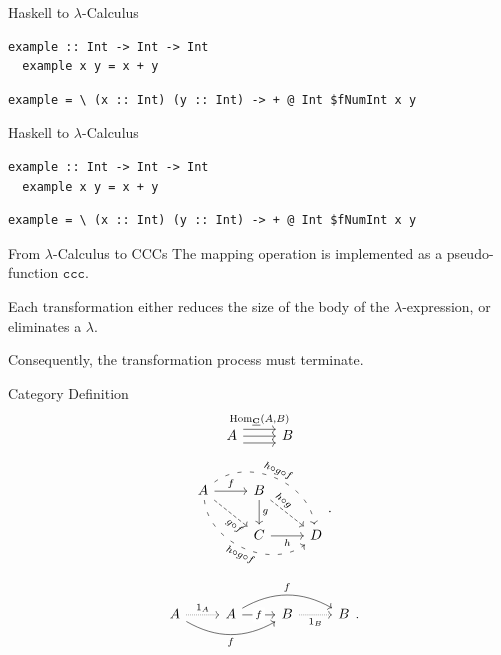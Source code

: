 \documentclass[10pt]{beamer}
\newcommand{\Cat}[1]{\ensuremath{\underline{\mathbf{#1}}}}
\newcommand{\Hom}[3]{\ensuremath{\mathrm{Hom}_{\Cat{#1}}(#2,#3)}}
\newcommand{\ccc}{\ensuremath{\mathtt{ccc}}}
\theoremstyle{definition}
\theoremstyle{remark}
\numberwithin{equation}{section}
\begin{document}
\begin{frame}[fragile]{Haskell to $\lambda$-Calculus}
  \begin{lstlisting}[frame=single]
  example :: Int -> Int -> Int
  example x y = x + y
  \end{lstlisting}

  \begin{lstlisting}[frame=single]
  example = \ (x :: Int) (y :: Int) -> + @ Int $fNumInt x y
  \end{lstlisting}
\end{frame}

\begin{frame}[fragile]{Haskell to $\lambda$-Calculus}
  \begin{lstlisting}[frame=single]
  example :: Int -> Int -> Int
  example x y = x + y
  \end{lstlisting}

  \begin{lstlisting}[frame=single]
  example = \ (x :: Int) (y :: Int) -> + @ Int $fNumInt x y
  \end{lstlisting}
\end{frame}


\begin{frame}[fragile]{From $\lambda$-Calculus to CCCs}
  The mapping operation is implemented as a pseudo-function $\ccc$.

  Each transformation either reduces the size of the body of the $\lambda$-expression,
  or eliminates a $\lambda$.

  Consequently, the transformation process must terminate.
\end{frame}

\begin{frame}[fragile]{Category Definition}
  \[
    \begin{tikzcd}
      A \arrow[shift left=2]{r}{\Hom{C}{A}{B}} \arrow{r} \arrow[shift right=2]{r} & B
    \end{tikzcd}
  \]
  \[
  \begin{tikzcd}
    A \arrow{r}{f} \arrow[sloped,near end,swap,dashed]{dr}{g \circ f} \arrow[bend
      right=60,sloped,swap,loosely dashed]{drr}{h \circ g \circ f} \arrow[bend
      left=60,sloped,loosely dashed]{drr}{h
      \circ g \circ f} & B \arrow{d}{g}
    \arrow[sloped,near start,dashed]{dr}{h \circ g} & \\
    & C \arrow[swap]{r}{h} & D
  \end{tikzcd}\rlap{.}
  \]
  \[
  \begin{tikzcd}
    A \arrow[densely dotted]{r}{1_A} \arrow[bend right=30,swap]{rr}{f} & A
    \arrow["f" description]{r}
    \arrow[bend left=30]{rr}{f} & B \arrow[swap,densely dotted]{r}{1_B} & B
  \end{tikzcd}\rlap{.}
  \]
\end{frame}
\end{document}
